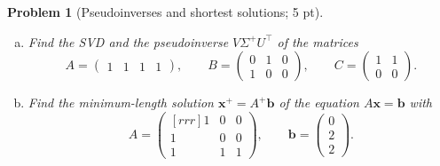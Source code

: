 \documentclass[12pt,a4]{article}
\newtheorem{problem}{Problem}
\newcommand{\bb}{{\mathbf b}}
\newcommand{\bx}{{\mathbf x}}
\begin{document}
\begin{problem}[Pseudoinverses and shortest solutions; 5 pt]\rm
	\begin{enumerate}[(a)]
		\item Find the SVD and the pseudoinverse $V\Sigma^+U^\top$ of the matrices
		\[
		A =
		\begin{pmatrix}
			1 & 1 & 1 & 1
		\end{pmatrix},
		\qquad
		B = \begin{pmatrix}
			0 & 1 & 0 \\ 1 & 0 & 0
		\end{pmatrix},\qquad
		C =
		\begin{pmatrix}
		1 & 1 \\ 0 & 0
		\end{pmatrix}.
		\]
		\item Find the minimum-length solution $\bx^+ = A^+ \bb$ of the equation $A\bx = \bb$ with
		\[
		A =  \begin{pmatrix}[rrr]
		1 & 0 & 0 \\ 1 & 0 & 0 \\ 1 & 1 & 1
		\end{pmatrix},
		\qquad \bb = \begin{pmatrix}
		0 \\ 2 \\ 2
		\end{pmatrix}.
		\]
	\end{enumerate}
\end{problem}
\end{document}
